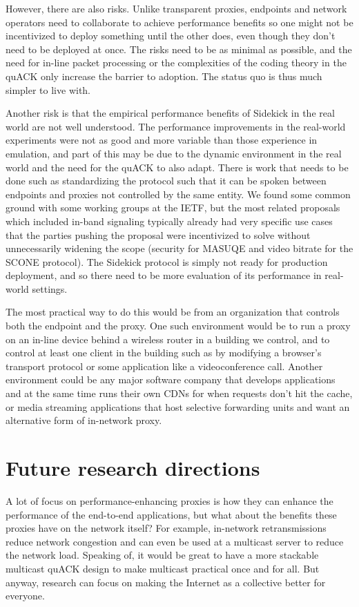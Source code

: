 However, there are also risks. Unlike transparent proxies, endpoints and network
operators need to collaborate to achieve performance benefits so one might not
be incentivized to deploy something until the other does, even though they
don't need to be deployed at once. The risks need to be as minimal as possible,
and the need for in-line packet processing or the complexities of the coding
theory in the quACK only increase the barrier to adoption. The status quo is
thus much simpler to live with.

Another risk is that the empirical performance benefits of Sidekick in the real
world are not well understood. The performance improvements in the real-world
experiments were not as good and more variable than those experience in
emulation, and part of this may be due to the dynamic environment in the real
world and the need for the quACK to also adapt. There is work that needs to be
done such as standardizing the protocol such that it can be spoken between
endpoints and proxies not controlled by the same entity. We found some common
ground with some working groups at the IETF, but the most related proposals
which included in-band signaling typically already had very specific use cases
that the parties pushing the proposal were incentivized to solve without
unnecessarily widening the scope (security for MASUQE and video bitrate for the
SCONE protocol). The Sidekick protocol is simply not ready for production
deployment, and so there need to be more evaluation of its performance in
real-world settings.

The most practical way to do this would be from an organization that controls
both the endpoint and the proxy. One such environment would be to run a proxy
on an in-line device behind a wireless router in a building we control, and to
control at least one client in the building such as by modifying a browser's
transport protocol or some application like a videoconference call. Another
environment could be any major software company that develops applications and
at the same time runs their own CDNs for when requests don't hit the cache, or
media streaming applications that host selective forwarding units and want an
alternative form of in-network proxy.

\section{Future research directions}
\label{sec:conclusion:future}

A lot of focus on performance-enhancing proxies is how they can enhance the
performance of the end-to-end applications, but what about the benefits these
proxies have on the network itself? For example, in-network retransmissions
reduce network congestion and can even be used at a multicast server to reduce
the network load. Speaking of, it would be great to have a more stackable
multicast quACK design to make multicast practical once and for all. But
anyway, research can focus on making the Internet as a collective better for
everyone.

